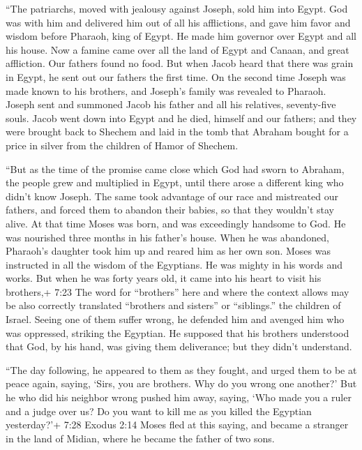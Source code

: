  ``The patriarchs, moved with jealousy against Joseph, sold
him into Egypt. God was with him  and delivered him out of
all his afflictions, and gave him favor and wisdom before Pharaoh, king
of Egypt. He made him governor over Egypt and all his house.
 Now a famine came over all the land of Egypt and Canaan,
and great affliction. Our fathers found no food.  But when
Jacob heard that there was grain in Egypt, he sent out our fathers the
first time.  On the second time Joseph was made known to
his brothers, and Joseph's family was revealed to Pharaoh. 
Joseph sent and summoned Jacob his father and all his relatives,
seventy-five souls.  Jacob went down into Egypt and he
died, himself and our fathers;  and they were brought back
to Shechem and laid in the tomb that Abraham bought for a price in
silver from the children of Hamor of Shechem.

 ``But as the time of the promise came close which God had
sworn to Abraham, the people grew and multiplied in Egypt, 
until there arose a different king who didn't know Joseph. 
The same took advantage of our race and mistreated our fathers, and
forced them to abandon their babies, so that they wouldn't stay alive.
 At that time Moses was born, and was exceedingly handsome
to God. He was nourished three months in his father's house.
 When he was abandoned, Pharaoh's daughter took him up and
reared him as her own son.  Moses was instructed in all the
wisdom of the Egyptians. He was mighty in his words and works.
 But when he was forty years old, it came into his heart to
visit his brothers,+ 7:23 The word for ``brothers'' here and where the
context allows may be also correctly translated ``brothers and sisters''
or ``siblings.'' the children of Israel.  Seeing one of
them suffer wrong, he defended him and avenged him who was oppressed,
striking the Egyptian.  He supposed that his brothers
understood that God, by his hand, was giving them deliverance; but they
didn't understand.

 ``The day following, he appeared to them as they fought,
and urged them to be at peace again, saying, `Sirs, you are brothers.
Why do you wrong one another?'  But he who did his neighbor
wrong pushed him away, saying, `Who made you a ruler and a judge over
us?  Do you want to kill me as you killed the Egyptian
yesterday?'+ 7:28 Exodus 2:14  Moses fled at this saying,
and became a stranger in the land of Midian, where he became the father
of two sons.

